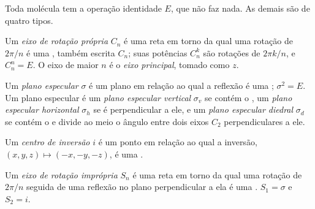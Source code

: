 Toda molécula tem a operação identidade $E$, que não faz nada. As
demais são de quatro tipos.

\begin{definition}\label{def:b3:point-groups:rotation}
Um \emph{eixo de rotação própria} $C_n$ é uma reta
em torno da qual uma rotação de $2\pi/n$ é uma , também
escrita $C_n$; suas potências $C_n^k$ são rotações de $2\pi k/n$, e $C_n^n = E$. O
eixo de maior $n$ é o \emph{eixo principal}, tomado
como $z$.
\end{definition}

\begin{definition}\label{def:b3:point-groups:mirror}
Um \emph{plano especular} $\sigma$ é um plano em relação ao qual
a reflexão é uma ; $\sigma^2 = E$. Um plano especular é um
\emph{plano especular vertical} $\sigma_v$ se
contém o , um \emph{plano especular
horizontal} $\sigma_h$ se é perpendicular a
ele, e um \emph{plano especular diedral}
$\sigma_d$ se contém o  e divide ao meio o ângulo entre
dois eixos $C_2$ perpendiculares a ele.
\end{definition}

\begin{definition}\label{def:b3:point-groups:inversion}
Um \emph{centro de inversão} $i$ é um ponto
em relação ao qual a inversão, $(x, y, z) \mapsto (-x, -y, -z)$, é uma .
\end{definition}

\begin{definition}\label{def:b3:point-groups:improper}
Um \emph{eixo de rotação imprópria} $S_n$ é uma
reta em torno da qual uma rotação de $2\pi/n$ seguida de uma reflexão no plano
perpendicular a ela é uma . $S_1 = \sigma$ e $S_2 = i$.
\end{definition}


